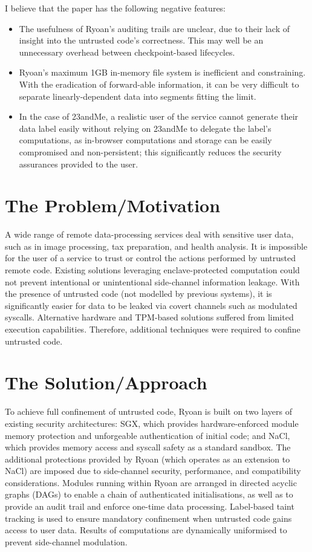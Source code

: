 \documentclass[11pt]{article}
\begin{document}
I believe that the paper has the following negative features:
\begin{itemize}
	\item The usefulness of Ryoan's auditing trails are unclear, due to their lack of insight into the untrusted code's correctness. This may well be an unnecessary overhead between checkpoint-based lifecycles.
	\item Ryoan's maximum 1GB in-memory file system is inefficient and constraining. With the eradication of forward-able information, it can be very difficult to separate linearly-dependent data into segments fitting the limit.
	\item In the case of 23andMe, a realistic user of the service cannot generate their data label easily without relying on 23andMe to delegate the label's computations, as in-browser computations and storage can be easily compromised and non-persistent; this significantly reduces the security assurances provided to the user.
\end{itemize}

\section*{The Problem/Motivation}

A wide range of remote data-processing services deal with sensitive user data, such as in image processing, tax preparation, and health analysis. It is impossible for the user of a service to trust or control the actions performed by untrusted remote code. Existing solutions leveraging enclave-protected computation \cite{arnautov2016scone, baumann2015shielding} could not prevent intentional or unintentional side-channel information leakage. With the presence of untrusted code (not modelled by previous systems), it is significantly easier for data to be leaked via covert channels such as modulated syscalls. Alternative hardware and TPM-based solutions \cite{mccune2007execution} suffered from limited execution capabilities. Therefore, additional techniques were required to confine untrusted code.

\section*{The Solution/Approach}

To achieve full confinement of untrusted code, Ryoan is built on two layers of existing security architectures: SGX, which provides hardware-enforced module memory protection and unforgeable authentication of initial code; and NaCl, which provides memory access and syscall safety as a standard sandbox. The additional protections provided by Ryoan (which operates as an extension to NaCl) are imposed due to side-channel security, performance, and compatibility considerations. Modules running within Ryoan are arranged in directed acyclic graphs (DAGs) to enable a chain of authenticated initialisations, as well as to provide an audit trail and enforce one-time data processing. Label-based taint tracking is used to ensure mandatory confinement when untrusted code gains access to user data. Results of computations are dynamically uniformised to prevent side-channel modulation.
\end{document}

